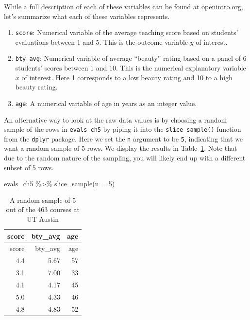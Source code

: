 \documentclass[
  letterpaper,
  DIV=11,
  numbers=noendperiod]{scrreprt}
\newenvironment{Shaded}{\begin{snugshade}}{\end{snugshade}}
\newcommand{\AttributeTok}[1]{\textcolor[rgb]{0.40,0.45,0.13}{#1}}
\newcommand{\DecValTok}[1]{\textcolor[rgb]{0.68,0.00,0.00}{#1}}
\newcommand{\FunctionTok}[1]{\textcolor[rgb]{0.28,0.35,0.67}{#1}}
\newcommand{\NormalTok}[1]{\textcolor[rgb]{0.00,0.23,0.31}{#1}}
\newcommand{\SpecialCharTok}[1]{\textcolor[rgb]{0.37,0.37,0.37}{#1}}
\theoremstyle{definition}
\theoremstyle{remark}
\begin{document}
While a full description of each of these variables can be found at
\href{https://www.openintro.org/stat/data/?data=evals}{openintro.org},
let's summarize what each of these variables represents.

\begin{enumerate}
\def\labelenumi{\arabic{enumi}.}
\item
  \texttt{score}: Numerical variable of the average teaching score based
  on students' evaluations between 1 and 5. This is the outcome variable
  \(y\) of interest.
\item
  \texttt{bty\_avg}: Numerical variable of average ``beauty'' rating
  based on a panel of 6 students' scores between 1 and 10. This is the
  numerical explanatory variable \(x\) of interest. Here 1 corresponds
  to a low beauty rating and 10 to a high beauty rating.
\item
  \texttt{age}: A numerical variable of age in years as an integer
  value.
\end{enumerate}

An alternative way to look at the raw data values is by choosing a
random sample of the rows in \texttt{evals\_ch5} by piping it into the
\texttt{slice\_sample()} function from the \texttt{dplyr} package. Here
we set the \texttt{n} argument to be \texttt{5}, indicating that we want
a random sample of 5 rows. We display the results in
Table~\ref{tbl-five-random-courses}. Note that due to the random nature
of the sampling, you will likely end up with a different subset of 5
rows.

\begin{Shaded}
\begin{Highlighting}[]
\NormalTok{evals\_ch5 }\SpecialCharTok{\%\textgreater{}\%}
  \FunctionTok{slice\_sample}\NormalTok{(}\AttributeTok{n =} \DecValTok{5}\NormalTok{)}
\end{Highlighting}
\end{Shaded}

\hypertarget{tbl-five-random-courses}{}
\begin{longtable}[]{@{}rrr@{}}
\caption{\label{tbl-five-random-courses}A random sample of 5 out of the
463 courses at UT Austin}\tabularnewline
\toprule()
score & bty\_avg & age \\
\midrule()
\endfirsthead
\toprule()
score & bty\_avg & age \\
\midrule()
\endhead
4.4 & 5.67 & 57 \\
3.1 & 7.00 & 33 \\
4.1 & 4.17 & 45 \\
5.0 & 4.33 & 46 \\
4.8 & 4.83 & 52 \\
\bottomrule()
\end{longtable}
\end{document}
